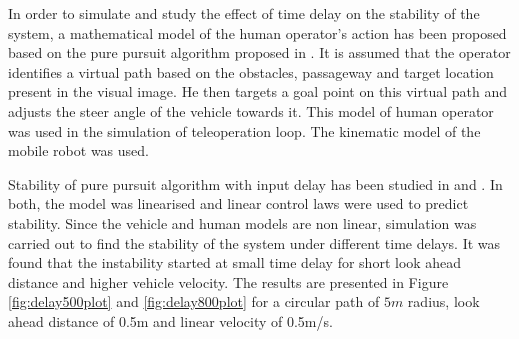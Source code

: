 \documentclass[12pt,a4paper, notitlepage]{article}
\begin{document}
 In order to simulate and study the effect of time delay on the stability of the system, a mathematical model of the human operator's action has been proposed based on the pure pursuit algorithm proposed in \cite{coulter1992implementation}. It is assumed that the operator identifies a virtual path based on the obstacles, passageway and target location present in the visual image. He then targets a goal point on this virtual path and adjusts the steer angle of the vehicle towards it. This model of human operator was used in the simulation of teleoperation loop. The kinematic model of the mobile robot was used.  
 
 Stability of pure pursuit algorithm with input delay has been studied in \cite{ollero1995stability} and \cite{murphy1994analysis}. In both, the model was linearised and linear control  laws were used to predict stability. Since the vehicle and  human models are non linear, simulation was carried out to find the stability of the system under different time delays. It was found that the instability started at small time delay for short look ahead distance and higher vehicle velocity. The results are presented in Figure \ref{fig:delay500plot} and \ref{fig:delay800plot} for a circular path of $5m$ radius, look ahead distance of 0.5m and linear velocity of 0.5m/s.
\end{document}
